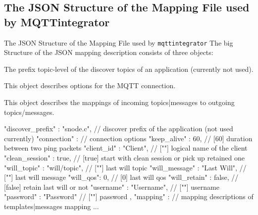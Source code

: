 ﻿\subsection{The \alert{JSON Structure} of the Mapping File used by MQTTintegrator}

\begin{frame}[fragile]{The \alert{JSON Structure} of the Mapping File used by \alert{\texttt{mqttintegrator}}}
  The big Structure of the JSON mapping description consists of three objects:
  \begin{description}
    \item[discover\_prefix] The prefix topic-level of the discover topics of an application (currently not used).
    \item[connection] This object describes options for the MQTT connection.
    \item[mapping] This object describes the mappings of incoming topics|messages to outgoing topics/messages.
  \end{description}

  \begin{jsoncode}[gobble=4]
    {
        "discover_prefix" : "snode.c",         // discover prefix of the application (not used currently)
        "connection" : {                       // connection options
            "keep_alive" : 60,                 // [60]    duration between two ping packets
            "client_id" : "Client",            // [""]    logical name of the client
            "clean_session" : true,            // [true]  start with clean session or pick up retained one
            "will_topic" : "will/topic",       // [""]    last will topic
            "will_message" : "Last Will",      // [""]    last will message
            "will_qos": 0,                     // [0]     last will qos
            "will_retain" : false,             // [false] retain last will or not
            "username" : "Username",           // [""]    username
            "password" : "Password"            // [""]    password
        },
        "mapping" : {                          // mapping descriptions of templates|messages mapping
            ...
        }
    }
  \end{jsoncode}
\end{frame}

